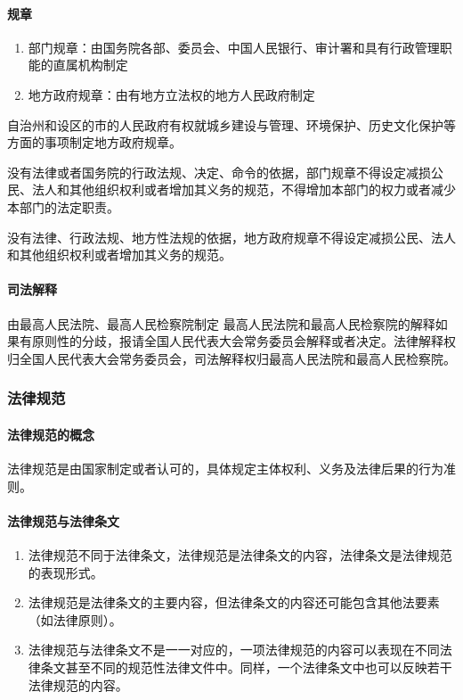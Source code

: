 \documentclass[UTF8,12pt]{ctexart}
\numberwithin{equation}{section} %
\numberwithin{figure}{section}
\numberwithin{table}{section}
\begin{document}
	\paragraph{规章}
	\begin{enumerate}
		\item 部门规章：由国务院各部、委员会、中国人民银行、审计署和具有行政管理职能的直属机构制定
		
		\item 地方政府规章：由有地方立法权的地方人民政府制定
	\end{enumerate}
	自治州和设区的市的人民政府有权就城乡建设与管理、环境保护、历史文化保护等方面的事项制定地方政府规章。
	
	没有法律或者国务院的行政法规、决定、命令的依据，部门规章不得设定减损公民、法人和其他组织权利或者增加其义务的规范，不得增加本部门的权力或者减少本部门的法定职责。
	
	没有法律、行政法规、地方性法规的依据，地方政府规章不得设定减损公民、法人和其他组织权利或者增加其义务的规范。
	
	\paragraph{司法解释}由最高人民法院、最高人民检察院制定
	最高人民法院和最高人民检察院的解释如果有原则性的分歧，报请全国人民代表大会常务委员会解释或者决定。法律解释权归全国人民代表大会常务委员会，司法解释权归最高人民法院和最高人民检察院。

	
	\subsubsection{法律规范}
	\paragraph{法律规范的概念}法律规范是由国家制定或者认可的，具体规定主体权利、义务及法律后果的行为准则。
	
	\paragraph{法律规范与法律条文}
	\begin{enumerate}
		\item 法律规范不同于法律条文，法律规范是法律条文的内容，法律条文是法律规范的表现形式。
		
		\item 法律规范是法律条文的主要内容，但法律条文的内容还可能包含其他法要素（如法律原则）。
		
		\item 法律规范与法律条文不是一一对应的，一项法律规范的内容可以表现在不同法律条文甚至不同的规范性法律文件中。同样，一个法律条文中也可以反映若干法律规范的内容。
	\end{enumerate}
	
\end{document}
